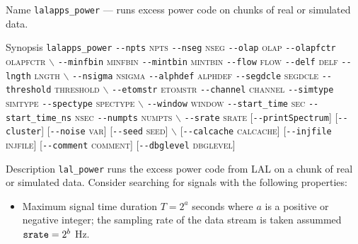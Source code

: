 \begin{entry}

\item[Name]
\verb$lalapps_power$ --- runs excess power code on chunks of real or simulated
data.

\item[Synopsis]
\verb$lalapps_power$ 
\verb$--npts$ \textsc{npts} 
\verb$--nseg$ \textsc{nseg}
\verb$--olap$ \textsc{olap} 
\verb$--olapfctr$ \textsc{olapfctr}
$\backslash$ \newline \hspace*{0.25in}
\verb$--minfbin$ \textsc{minfbin} 
\verb$--mintbin$ \textsc{mintbin} 
\verb$--flow$ \textsc{flow} 
\verb$--delf$ \textsc{delf} 
\verb$--lngth$ \textsc{lngth} 
$\backslash$ \newline \hspace*{0.25in}
\verb$--nsigma$ \textsc{nsigma}
\verb$--alphdef$ \textsc{alphdef}  
\verb$--segdcle$ \textsc{segdcle} 
\verb$--threshold$ \textsc{threshold} 
$\backslash$ \newline \hspace*{0.25in}
\verb$--etomstr$ \textsc{etomstr}
\verb$--channel$ \textsc{channel} 
\verb$--simtype$ \textsc{simtype} 
\verb$--spectype$ \textsc{spectype} 
$\backslash$ \newline \hspace*{0.25in}
\verb$--window$ \textsc{window} 
\verb$--start_time$ \textsc{sec} 
\verb$--start_time_ns$ \textsc{nsec} 
\verb$--numpts$ \textsc{numpts} 
$\backslash$ \newline \hspace*{0.25in}
\verb$--srate$ \textsc{srate} 
[\verb$--printSpectrum$] 
[\verb$--cluster$]
[\verb$--noise$ \textsc{var}] 
[\verb$--seed$ \textsc{seed}] 
$\backslash$ \newline \hspace*{0.25in}
[\verb$--calcache$ \textsc{calcache}] 
[\verb$--injfile$ \textsc{injfile}] 
[\verb$--comment$ \textsc{comment}]
[\verb$--dbglevel$ \textsc{dbglevel}]

\item[Description] 
\verb$lal_power$ runs the excess power code from LAL on a chunk of
real or simulated data.    Consider searching  for signals with the
following properties:
\begin{itemize}
\item Maximum signal time duration $T=2^a$ seconds where $a$ is a
positive or negative integer;  the sampling rate of the data stream is
taken assummed $\mbox{\texttt{srate}} = 2^b$ Hz.


\end{itemize}
\end{entry}
